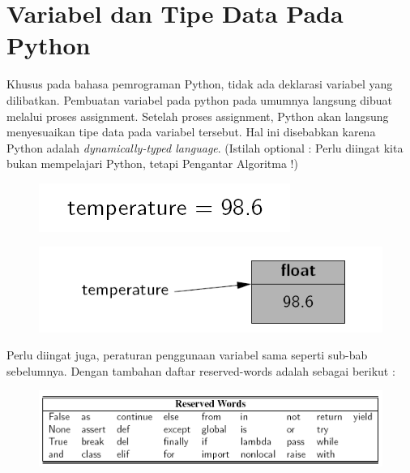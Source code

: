 
\section{Variabel dan Tipe Data Pada Python}
Khusus pada bahasa pemrograman Python, tidak ada deklarasi variabel yang dilibatkan. Pembuatan variabel pada python pada umumnya langsung dibuat melalui proses assignment. Setelah proses assignment, Python akan langsung menyesuaikan tipe data   pada variabel tersebut. Hal ini disebabkan karena Python adalah \textit{dynamically-typed language}. (Istilah optional : Perlu diingat kita bukan mempelajari Python, tetapi Pengantar Algoritma !)
	\begin{figure}
		\centering
		\includegraphics[scale=0.5]{fig/1/Gambar16.png}	
		\end{figure}

\begin{figure}
		\centering
		\includegraphics[scale=0.5]{fig/1/Gambar16a.png}	
		\end{figure}

Perlu diingat juga, peraturan penggunaan variabel sama seperti sub-bab sebelumnya.  Dengan tambahan daftar reserved-words adalah sebagai berikut : 
		\begin{figure}
		\centering
		\includegraphics[scale=0.4]{fig/1/Gambar17.png}	
		\end{figure}



